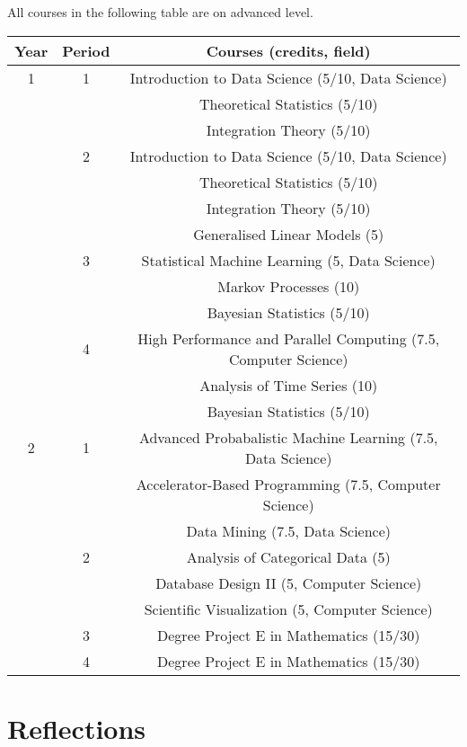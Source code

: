 \documentclass{article}
\begin{document}
  All courses in the following table are on advanced level.

  \begin{longtable}{|c|c|c|}
    \hline
    Year & Period & Courses (credits, field) \\
    \hline
    1 & 1 & Introduction to Data Science (5/10, Data Science) \\
      &   & Theoretical Statistics (5/10) \\
      &   & Integration Theory (5/10) \\
    \hline
      & 2 & Introduction to Data Science (5/10, Data Science) \\
      &   & Theoretical Statistics (5/10) \\
      &   & Integration Theory (5/10) \\
      &   & Generalised Linear Models (5) \\
    \hline
      & 3 & Statistical Machine Learning (5, Data Science) \\
      &   & Markov Processes (10) \\
      &   & Bayesian Statistics (5/10) \\
    \hline
      & 4 & High Performance and Parallel Computing (7.5, Computer Science) \\
      &   & Analysis of Time Series (10) \\
      &   & Bayesian Statistics (5/10) \\
    \hline
    2 & 1 & Advanced Probabalistic Machine Learning (7.5, Data Science) \\
      &   & Accelerator-Based Programming (7.5, Computer Science) \\
      &   & Data Mining (7.5, Data Science) \\
    \hline
      & 2 & Analysis of Categorical Data (5) \\
      &   & Database Design II (5, Computer Science) \\
      &   & Scientific Visualization (5, Computer Science) \\
    \hline
      & 3 & Degree Project E in Mathematics (15/30) \\
    \hline
      & 4 & Degree Project E in Mathematics (15/30) \\
    \hline
  \end{longtable}

  \section{Reflections}
\end{document}
